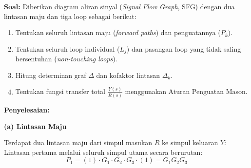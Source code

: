 \documentclass[11pt,a4paper]{article}
\begin{document}
\textbf{Soal:}  
Diberikan diagram aliran sinyal (\textit{Signal Flow Graph}, SFG) dengan dua lintasan maju dan tiga loop sebagai berikut:
\begin{center}
\end{center}
\begin{enumerate}[label=(\alph*)]
    \item Tentukan seluruh lintasan maju (\textit{forward paths}) dan penguatannya ($P_k$).
    \item Tentukan seluruh loop individual ($L_j$) dan pasangan loop yang tidak saling bersentuhan (\textit{non-touching loops}).
    \item Hitung determinan graf $\Delta$ dan kofaktor lintasan $\Delta_k$.
    \item Tentukan fungsi transfer total $\frac{Y(s)}{R(s)}$ menggunakan Aturan Penguatan Mason.
\end{enumerate}

\textbf{Penyelesaian:}

\textbf{(a) Lintasan Maju}

Terdapat dua lintasan maju dari simpul masukan $R$ ke simpul keluaran $Y$:
Lintasan pertama melalui seluruh simpul utama secara berurutan:
$$P_1 = (1) \cdot G_1 \cdot G_2 \cdot G_3 \cdot (1) = G_1 G_2 G_3$$
\end{document}
